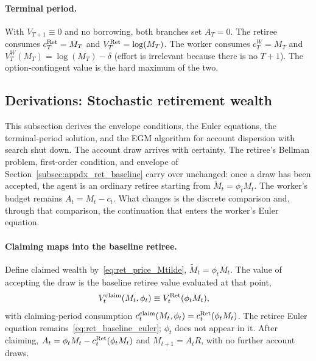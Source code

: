 \paragraph{Terminal period.}
With $V_{T+1}\equiv 0$ and no borrowing, both branches set $A_T=0$. The retiree consumes $c_T^{\mathrm{Ret}}=M_T$ and $V_T^{\mathrm{Ret}}=\log(M_T)$. The worker consumes $c_T^{W}=M_T$ and $V_T^{W}(M_T)=\log(M_T)-\delta$ (effort is irrelevant because there is no $T+1$). The option-contingent value is the hard maximum of the two.

\subsection{Derivations: Stochastic retirement wealth}\label{subsec:appdx_ret_price}
This subsection derives the envelope conditions, the Euler equations, the terminal-period solution, and the EGM algorithm for account dispersion with search shut down. The account draw arrives with certainty. The retiree's Bellman problem, first-order condition, and envelope of Section~\ref{subsec:appdx_ret_baseline} carry over unchanged: once a draw has been accepted, the agent is an ordinary retiree starting from $\tilde M_t=\phi_t M_t$. The worker's budget remains $A_t=M_t-c_t$. What changes is the discrete comparison and, through that comparison, the continuation that enters the worker's Euler equation.

\paragraph{Claiming maps into the baseline retiree.}
Define claimed wealth by~\eqref{eq:ret_price_Mtilde}, $\tilde M_t=\phi_t M_t$. The value of accepting the draw is the baseline retiree value evaluated at that point,
\begin{align}
	V_t^{\mathrm{claim}}(M_t,\phi_t)
	&\equiv V_t^{\mathrm{Ret}}(\phi_t M_t),
	\label{eq:ret_price_Vclaim}
\end{align}
with claiming-period consumption $c_t^{\mathrm{claim}}(M_t,\phi_t)=c_t^{\mathrm{Ret}}(\phi_t M_t)$. The retiree Euler equation remains~\eqref{eq:ret_baseline_euler}; $\phi_t$ does not appear in it. After claiming, $A_t=\phi_t M_t-c_t^{\mathrm{Ret}}(\phi_t M_t)$ and $M_{t+1}=A_t R$, with no further account draws.

